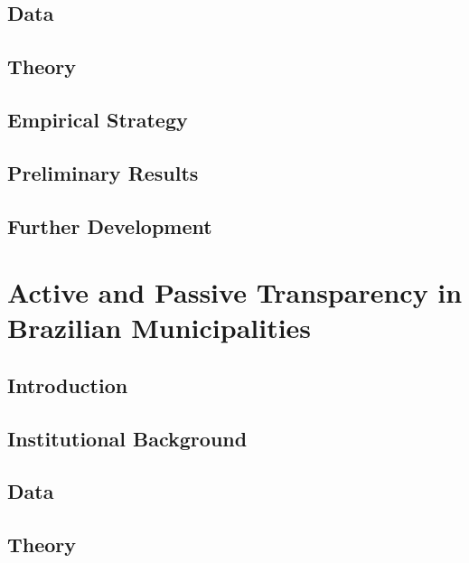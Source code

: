 \documentclass[11pt]{article}
\begin{document}
\subsection{Data} \label{subsec:data_paper2}

\subsection{Theory} \label{subsec:theory_paper2}

\subsection{Empirical Strategy} \label{subsec:methods_paper2}

\subsection{Preliminary Results} \label{subsec:results_paper2}

\subsection{Further Development} \label{subsec:conclusion_paper2}

\clearpage

\section{Active and Passive Transparency in Brazilian Municipalities} \label{sec:paper3}

\subsection{Introduction} \label{subsec:introduction_paper3}

\subsection{Institutional Background} \label{subsec:background_paper3}

\subsection{Data} \label{subsec:data_paper3}

\subsection{Theory} \label{subsec:theory_paper3}
\end{document}
